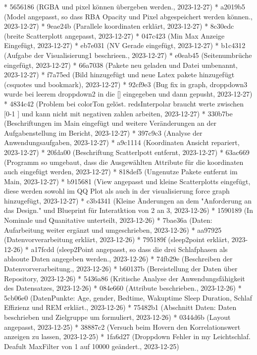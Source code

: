 \documentclass[usegeometry=true]{scrartcl}
\begin{document}
* 5656186 (RGBA und pixel können übergeben werden., 2023-12-27)
* a2019b5 (Model angepasst, so dass RBA Opacity und Pixel abgespeichert werden können., 2023-12-27)
* 9eae24b (Parallele koordinaten erklärt, 2023-12-27)
* 8c30edc (breite Scatterplott angepasst, 2023-12-27)
* 047c423 (Min Max Anzeige Eingefügt, 2023-12-27)
* eb7e031 (NV Gerade eingefügt, 2023-12-27)
* b1c4312 (Aufgabe der Visualisierung1 beschrieen., 2023-12-27)
* e0eab45 (Seitenumbrüche eingefügt, 2023-12-27)
* 66a7038 (Pakete neu geladen und Datei umbenannt, 2023-12-27)
* f7a75ed (Bild hinzugefügt und neue Latex pakete hinzugefügt (csquotes und bookmark), 2023-12-27)
* 92cf9e3 (Bug fix in graph, droppdown3 wurde bei leerem droppdown2 in die [] eingegeben und dann gepusht, 2023-12-27)
* 4834c42 (Problem bei colorTon gelöst. redsInterpolar braucht werte zwischen [0-1 ] und kann nicht mit negativen zahlen arbeiten, 2023-12-27)
* 330b7be (Beschriftungen im Main eingefügt und weitere Veränderungen an der Aufgabenstellung im Bericht, 2023-12-27)
* 397c9c3 (Analyse der Anwendungsaufgaben, 2023-12-27)
* a9c1114 (Koordinaten Ansicht repariert, 2023-12-27)
* 20fda00 (Beschriftung Scatterlpott entfernt, 2023-12-27)
* 63ac669 (Programm so umgebaut, dass die Ausgewählten Attribute für die koordinaten auch eingefügt werden, 2023-12-27)
* 818def5 (Ungenutze Pakete entfernt im Main, 2023-12-27)
* b915681 (View angepasst und kleine Scatterplotts eingefügt, diese werden sowohl im QQ Plot als auch in der visualisierung force graph hinzugefügt, 2023-12-27)
* c3b4341 (Kleine Änderungen an dem "Anforderung an das Design." und Blueprint für Interatktion von 2 an 3, 2023-12-26)
* 1590189 (In Nominale und Quanitative unterteilt, 2023-12-26)
* 7bae36a (Daten: Aufarbeitung weiter ergänzt und umgeschrieben, 2023-12-26)
* aa97925 (Datenvorverarbeitung erklärt, 2023-12-26)
* 795189f (sleep2point erklärt, 2023-12-26)
* a17fcdd (sleep2Point angepasst, so dass die drei Schlafphasen als ablsoute Daten angegeben werden., 2023-12-26)
* 74fb29e (Beschreiben der Datenvorverarbeitung., 2023-12-26)
* b60137b (Bereistellung der Daten über Repository, 2023-12-26)
* 5436a86 (Kritische Analyse der Anwendungsfähigkeit des Datensatzes, 2023-12-26)
* 084e660 (Attribute beschrieben., 2023-12-26)
* 5cb06e0 (DatenPunkte: Age, gender, Bedtime, Wakuptime Sleep Duration, Schlaf Effizienz und REM erklärt., 2023-12-26)
* 75482b1 (Abschnitt Daten: Daten beschrieben und Zielgruppe um formuliert, 2023-12-26)
* 0344d6b (Layout angepasst, 2023-12-25)
* 38887c2 (Versuch beim Hovern den Korrelationswert anzeigen zu lassen, 2023-12-25)
* 1fa6d27 (Droppdown Fehler in my Leichtschlaf. Deafult MaxFilter von 1 auf 10000 geändert., 2023-12-25)
\end{document}
